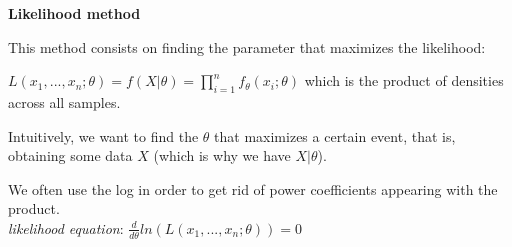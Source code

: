 {\fontsize{12pt}{22pt} \textbf{Likelihood method}\par}

\vspace{5mm}

This method consists on finding the parameter that maximizes the likelihood:

$L(x_1,...,x_n;\theta) = f(X | \theta) = \prod_{i=1}^{n}f_{\theta}(x_i;\theta)$ which is the product of densities across all samples.

\vspace{5mm}

Intuitively, we want to find the $\theta$ that maximizes a certain event, that is, obtaining some data $X$ (which is why we have $X | \theta$).

We often use the log in order to get rid of power coefficients appearing with the product. \\
\textit{likelihood equation}: $\frac{d}{d\theta}ln(L(x_1,...,x_n;\theta))=0$

\vspace{5mm}